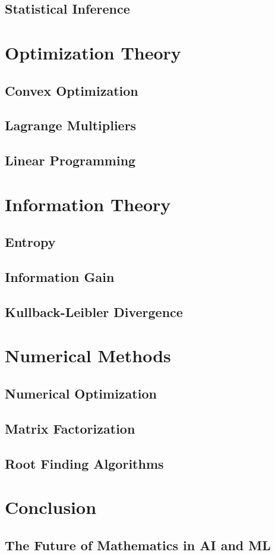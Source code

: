 \documentclass{article}
\begin{document}
	\subsection{Statistical Inference}
	
	\section{Optimization Theory}
	\subsection{Convex Optimization}
	\subsection{Lagrange Multipliers}
	\subsection{Linear Programming}
	
	\section{Information Theory}
	\subsection{Entropy}
	\subsection{Information Gain}
	\subsection{Kullback-Leibler Divergence}
	
	\section{Numerical Methods}
	\subsection{Numerical Optimization}
	\subsection{Matrix Factorization}
	\subsection{Root Finding Algorithms}
	
	\section{Conclusion}
	\subsection{The Future of Mathematics in AI and ML}
	
\end{document}
